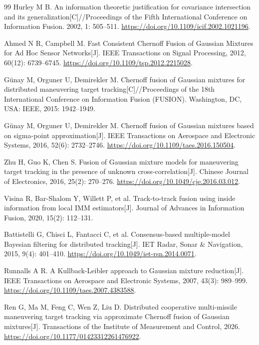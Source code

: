 \documentclass[UTF8,a4paper,zihao=-4]{ctexart}
\begin{document}
{\begin{thebibliography}{99}
 Hurley M B. An information theoretic justification for covariance intersection and its generalization[C]//Proceedings of the Fifth International Conference on Information Fusion. 2002, 1: 505--511.
\url{https://doi.org/10.1109/icif.2002.1021196}.

 Ahmed N R, Campbell M. Fast Consistent Chernoff Fusion of Gaussian Mixtures for Ad Hoc Sensor Networks[J]. IEEE Transactions on Signal Processing, 2012, 60(12): 6739--6745.
\url{https://doi.org/10.1109/tsp.2012.2215028}.

 Günay M, Orguner U, Demirekler M. Chernoff fusion of Gaussian mixtures for distributed maneuvering target tracking[C]//Proceedings of the 18th International Conference on Information Fusion (FUSION). Washington, DC, USA: IEEE, 2015: 1942--1949.

 Günay M, Orguner U, Demirekler M. Chernoff fusion of Gaussian mixtures based on sigma-point approximation[J]. IEEE Transactions on Aerospace and Electronic Systems, 2016, 52(6): 2732--2746.
\url{https://doi.org/10.1109/taes.2016.150504}.

 Zhu H, Guo K, Chen S. Fusion of Gaussian mixture models for maneuvering target tracking in the presence of unknown cross-correlation[J]. Chinese Journal of Electronics, 2016, 25(2): 270--276.
\url{https://doi.org/10.1049/cje.2016.03.012}.

 Visina R, Bar-Shalom Y, Willett P, et al. Track-to-track fusion using inside information from local IMM estimators[J]. Journal of Advances in Information Fusion, 2020, 15(2): 112--131.

 Battistelli G, Chisci L, Fantacci C, et al. Consensus-based multiple-model Bayesian filtering for distributed tracking[J]. IET Radar, Sonar \& Navigation, 2015, 9(4): 401--410.
\url{https://doi.org/10.1049/iet-rsn.2014.0071}.

 Runnalls A R. A Kullback-Leibler approach to Gaussian mixture reduction[J]. IEEE Transactions on Aerospace and Electronic Systems, 2007, 43(3): 989--999.
\url{https://doi.org/10.1109/taes.2007.4383588}.

 Ren G, Ma M, Feng C, Wen Z, Liu D. Distributed cooperative multi-missile maneuvering target tracking via approximate Chernoff fusion of Gaussian mixtures[J]. Transactions of the Institute of Measurement and Control, 2026.
\url{https://doi.org/10.1177/01423312261476922}.


\end{thebibliography}}
\end{document}
